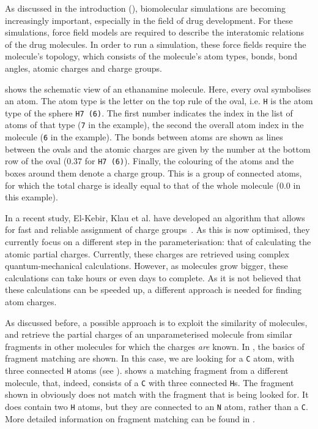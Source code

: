 As discussed in the introduction (), biomolecular simulations are becoming increasingly important, especially in the field of drug development. For these simulations, force field models are required to describe the interatomic relations of the drug molecules. In order to run a simulation, these force fields require the molecule's topology, which consists of the molecule's atom types, bonds, bond angles, atomic charges and charge groups.

 shows the schematic view of an ethanamine molecule. Here, every oval symbolises an atom. The atom type is the letter on the top rule of the oval, i.e. \verb|H| is the atom type of the sphere \verb|H7 (6)|. The first number indicates the index in the list of atoms of that type (\verb|7| in the example), the second the overall atom index in the molecule (\verb|6| in the example). The bonds between atoms are shown as lines between the ovals and the atomic charges are given by the number at the bottom row of the oval ($0.37$ for \verb|H7 (6)|). Finally, the colouring of the atoms and the boxes around them denote a charge group. This is a group of connected atoms, for which the total charge is ideally equal to that of the whole molecule ($0.0$ in this example).

In a recent study, El-Kebir, Klau et al. have developed an algorithm that allows for fast and reliable assignment of charge groups~\cite{canzar2012charge}. As this is now optimised, they currently focus on a different step in the parameterisation: that of calculating the atomic partial charges. Currently, these charges are retrieved using complex quantum-mechanical calculations. However, as molecules grow bigger, these calculations can take hours or even days to complete. As it is not believed that these calculations can be speeded up, a different approach is needed for finding atom charges.

As discussed before, a possible approach is to exploit the similarity of molecules, and retrieve the partial charges of an unparameterised molecule from similar fragments in other molecules for which the charges \emph{are} known. In , the basics of fragment matching are shown. In this case, we are looking for a \verb|C| atom, with three connected \verb|H| atoms (see ).  shows a matching fragment from a different molecule, that, indeed, consists of a \verb|C| with three connected \verb|H|s. The fragment shown in  obviously does not match with the fragment that is being looked for. It does contain two \verb|H| atoms, but they are connected to an \verb|N| atom, rather than a \verb|C|. More detailed information on fragment matching can be found in .

